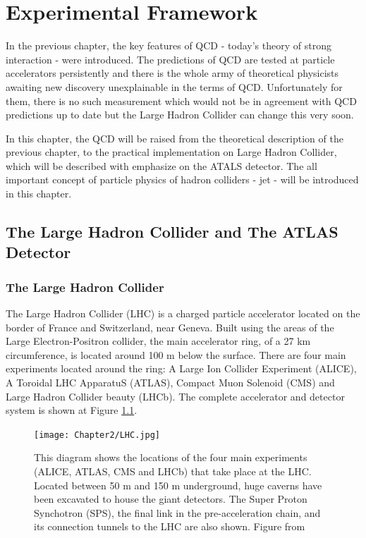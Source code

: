 \chapter{Experimental Framework}


In the previous chapter, the key features of QCD - today's theory of strong
interaction - were introduced. The predictions of QCD are tested at particle
accelerators persistently and there is the whole army of theoretical physicists
awaiting new discovery unexplainable in the terms of QCD.
Unfortunately for them, there is no such measurement which would not be in
agreement with QCD predictions up to date but the Large Hadron Collider can
change this very soon.

In this chapter, the QCD will be raised from the theoretical description of the
previous chapter, to the practical implementation on Large Hadron Collider,
which will be described with emphasize on the ATALS detector. The all important
concept of particle physics of hadron colliders - jet - will be introduced in
this chapter.

\section{The Large Hadron Collider and The ATLAS Detector}

\subsection{The Large Hadron Collider}

The Large Hadron Collider (LHC) \cite{LHC, LHCPastPresentFuture} is a charged
particle accelerator located on the border of France and Switzerland, near
Geneva. Built using the areas of the Large Electron-Positron collider, the main
accelerator ring, of a 27 km circumference, is located around 100 m below the
surface. There are four main experiments located around the ring: A Large Ion
Collider Experiment (ALICE), A Toroidal LHC ApparatuS (ATLAS), Compact Muon
Solenoid (CMS) and Large Hadron Collider beauty (LHCb). The complete accelerator
and detector system is shown at Figure \ref{fig:LHC}.

\begin{figure}[t]
  \centering
  \texttt{[image: Chapter2/LHC.jpg]}
  \caption{This diagram shows the locations of the four main experiments (ALICE,
    ATLAS, CMS and LHCb) that take place at the LHC. Located between 50 m and
    150 m underground, huge caverns have been excavated to house the giant
    detectors. The Super Proton Synchotron (SPS), the final link in the
    pre-acceleration chain, and its connection tunnels to the LHC are also
    shown.  Figure from \cite{CERN:ATLASexperimentPictureswiki}  }
  \label{fig:LHC}
\end{figure}

